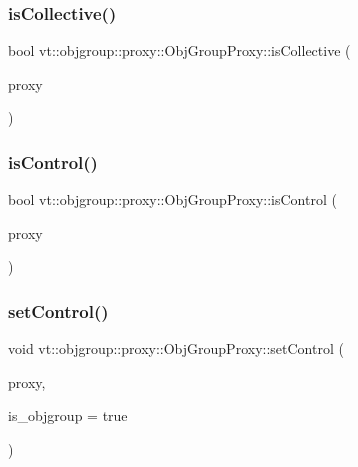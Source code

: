 \subsubsection{\texorpdfstring{is\+Collective()}{isCollective()}}
{\footnotesize\ttfamily bool vt\+::objgroup\+::proxy\+::\+Obj\+Group\+Proxy\+::is\+Collective (\begin{DoxyParamCaption}\item[{\hyperlink{namespacevt_ad7cae989df485fccca57f0792a880a8e}{Obj\+Group\+Proxy\+Type}}]{proxy }\end{DoxyParamCaption})\hspace{0.3cm}{\ttfamily [static]}}

\mbox{\label{structvt_1_1objgroup_1_1proxy_1_1_obj_group_proxy_a165dce2ea9c2f711132ed70e38c7835d}} 
\subsubsection{\texorpdfstring{is\+Control()}{isControl()}}
{\footnotesize\ttfamily bool vt\+::objgroup\+::proxy\+::\+Obj\+Group\+Proxy\+::is\+Control (\begin{DoxyParamCaption}\item[{\hyperlink{namespacevt_ad7cae989df485fccca57f0792a880a8e}{Obj\+Group\+Proxy\+Type}}]{proxy }\end{DoxyParamCaption})\hspace{0.3cm}{\ttfamily [static]}}

\mbox{\label{structvt_1_1objgroup_1_1proxy_1_1_obj_group_proxy_ad80d3bcbde0bad7a7dc0c9082c584e18}} 
\subsubsection{\texorpdfstring{set\+Control()}{setControl()}}
{\footnotesize\ttfamily void vt\+::objgroup\+::proxy\+::\+Obj\+Group\+Proxy\+::set\+Control (\begin{DoxyParamCaption}\item[{\hyperlink{namespacevt_ad7cae989df485fccca57f0792a880a8e}{Obj\+Group\+Proxy\+Type} \&}]{proxy,  }\item[{bool}]{is\+\_\+objgroup = {\ttfamily true} }\end{DoxyParamCaption})\hspace{0.3cm}{\ttfamily [static]}}

